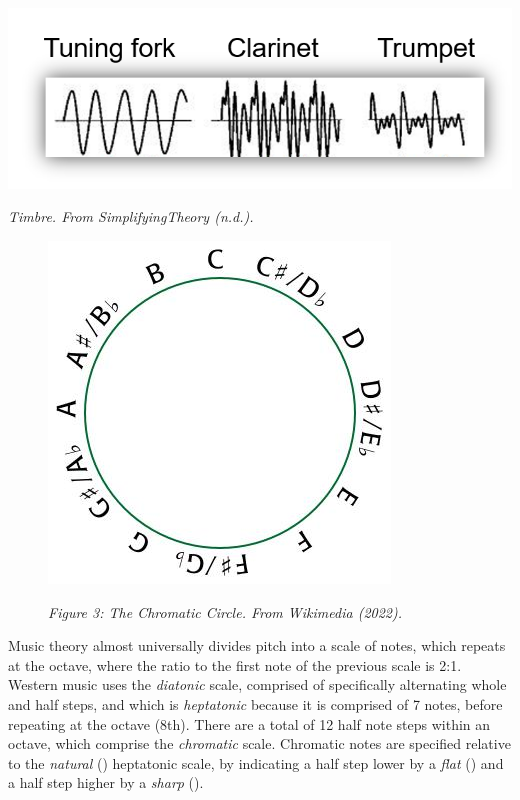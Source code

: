 \begin{center}
\includegraphics[scale=0.6]{./Images/Timbre.jpeg}

{\it \footnotesize Timbre. From SimplifyingTheory (n.d.).}
\end{center}


\begin{figure}
\includegraphics[scale=0.35]{./Images/pitch.jpg}

{\it \footnotesize Figure 3: The Chromatic Circle. From Wikimedia (2022).}

\end{figure}

\noindent Music theory almost universally divides pitch into a scale of notes, which repeats at the octave, where the ratio to the first note of the previous scale is 2:1. Western music uses the \textit{diatonic} scale, comprised of specifically alternating whole and half steps, and which is \textit{heptatonic} because it is comprised of 7 notes, before repeating at the octave (8th). There are a total of 12 half note steps within an octave, which comprise the \textit{chromatic} scale. Chromatic notes are specified relative to the \textit{natural} (\natural) heptatonic scale, by indicating a half step lower by a \textit{flat} (\flat) and a half step higher by a \textit{sharp}  (\sharp). 



